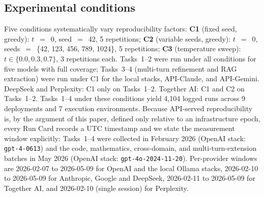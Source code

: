 \documentclass[sn-nature]{sn-jnl}
\begin{document}
\subsection{Experimental conditions}\label{subsec:conditions}

Five conditions systematically vary reproducibility factors:
\textbf{C1} (fixed seed, greedy): $t$~$=$~0, seed~$=$~42, 5 repetitions;
\textbf{C2} (variable seeds, greedy): $t$~$=$~0, seeds~$=$~\{42, 123, 456, 789, 1024\}, 5 repetitions;
\textbf{C3} (temperature sweep): $t \in \{0.0, 0.3, 0.7\}$, 3 repetitions each.
Tasks~1--2 were run under all conditions for five models with full coverage; Tasks~3--4 (multi-turn refinement and RAG extraction) were run under C1 for the local stacks, API-Claude, and API-Gemini.
DeepSeek and Perplexity: C1 only on Tasks~1--2.
Together AI: C1 and C2 on Tasks~1--2.
Tasks~1--4 under these conditions yield 4{,}104 logged runs across 9 deployments and 7 execution environments.
Because API-served reproducibility is, by the argument of this paper, defined only relative to an infrastructure epoch, every Run Card records a UTC timestamp and we state the measurement window explicitly: Tasks~1--4 were collected in February 2026 (OpenAI stack: \texttt{gpt-4-0613}) and the code, mathematics, cross-domain, and multi-turn-extension batches in May 2026 (OpenAI stack: \texttt{gpt-4o-2024-11-20}). Per-provider windows are 2026-02-07 to 2026-05-09 for OpenAI and the local Ollama stacks, 2026-02-10 to 2026-05-09 for Anthropic, Google and DeepSeek, 2026-02-11 to 2026-05-09 for Together AI, and 2026-02-10 (single session) for Perplexity.
\end{document}
